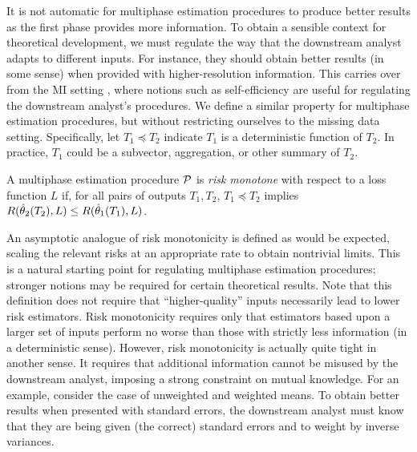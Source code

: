 It is not automatic for multiphase estimation procedures to produce better results as the first phase provides more information.
To obtain a sensible context for theoretical development, we must regulate the way that the downstream analyst adapts to different inputs.
For instance, they should obtain better results (in some sense) when provided with higher-resolution information.
This carries over from the MI  setting \citep{Meng1994,Meng2003,Meng2012,Xie2012}, where notions such as self-efficiency are useful for regulating the downstream analyst's procedures.
We define a similar property for multiphase estimation procedures, but without restricting  ourselves to the missing data setting. 
Specifically, let $T_1 \preceq T_2$ indicate $T_1$ is a deterministic function of $T_2$.
In practice, $T_1$ could be a subvector, aggregation, or other summary of $T_2$.
%
\begin{definition}
A multiphase estimation procedure $\mathcal{P}$ is \emph{risk monotone} with respect to a loss function $L$ if, for all pairs of outputs $T_1, T_2$, $T_1 \preceq T_2$ implies $R(\hat{\theta}_2(T_2), L) \leq R(\hat{\theta}_1(T_1), L)$.
\end{definition}
%
An asymptotic analogue of risk monotonicity is defined as would be expected, scaling the relevant risks at an appropriate rate to obtain nontrivial limits.
This is a natural starting point for regulating multiphase estimation procedures; stronger notions may be required for certain theoretical results.
Note that this definition does not require that ``higher-quality'' inputs necessarily lead to lower risk estimators.
Risk monotonicity requires only that estimators based upon a larger set of inputs perform no worse than those with strictly less information (in a deterministic sense).
However, risk monotonicity is actually quite tight in another sense.
It requires that additional information cannot be misused by the downstream analyst, imposing a strong constraint on mutual knowledge.
For an example, consider the case of unweighted and weighted means.
To obtain better results when presented with standard errors, the downstream analyst must know that they are being given (the correct) standard errors and to weight by inverse variances.

